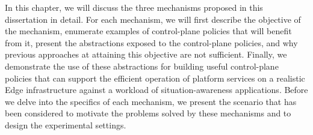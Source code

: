\par In this chapter, we will discuss the three mechanisms proposed in this dissertation in detail. For each mechanism, we will first describe the objective of the mechanism, enumerate examples of control-plane policies that will benefit from it, present the abstractions exposed to the control-plane policies, and why previous approaches at attaining this objective are not sufficient. Finally, we demonstrate the use of these abstractions for building useful control-plane policies that can support the efficient operation of platform services on a realistic Edge infrastructure against a workload of situation-awareness applications. Before we delve into the specifics of each mechanism, we present the scenario that has been considered to motivate the problems solved by these mechanisms and to design the experimental settings. 

